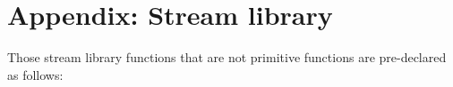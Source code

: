 \section*{Appendix: Stream library}

Those stream library functions that are not primitive functions are
pre-declared as follows:


